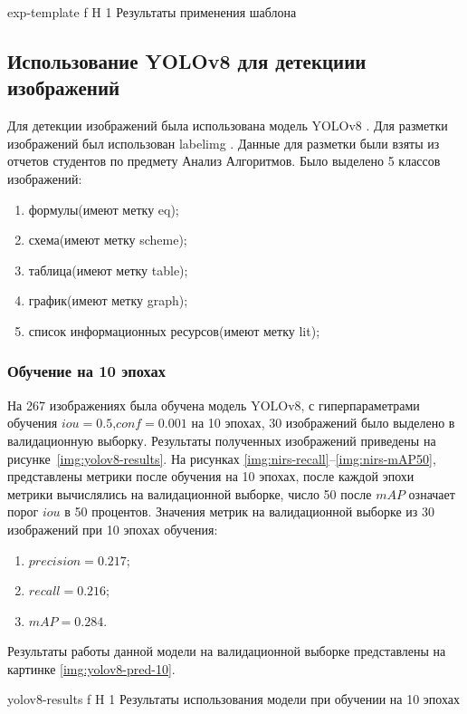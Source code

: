 {exp-template} %
{f} %
{H} %
{1\textwidth} %
{Результаты применения шаблона} %



\subsection{Использование YOLOv8 для детекциии изображений}
Для детекции изображений была использована модель YOLOv8 \cite{YOLOv8}. Для разметки изображений был использован labelimg \cite{labelimg}. Данные для разметки были взяты из отчетов студентов по предмету Анализ Алгоритмов.
Было выделено 5 классов изображений:
\begin{enumerate}
	\item формулы(имеют метку eq);
	\item схема(имеют метку scheme);
	\item таблица(имеют метку table);
	\item график(имеют метку graph);
	\item список информационных ресурсов(имеют метку lit);
\end{enumerate}

\subsubsection{Обучение на 10 эпохах}
На 267 изображениях была обучена модель YOLOv8, с гиперпараметрами обучения $iou=0.5$,$conf=0.001$ на 10 эпохах, 30 изображений было выделено в валидационную выборку.
Результаты полученных изображений приведены на рисунке~\ref{img:yolov8-results}.
На рисунках \ref{img:nirs-recall}--\ref{img:nirs-mAP50}, представлены метрики после обучения на 10 эпохах, 
после каждой эпохи метрики вычислялись на валидационной выборке,
число 50 после $mAP$  означает порог $iou$ в 50 процентов.
Значения метрик  на валидационной выборке из 30 изображений при 10 эпохах обучения:
\begin{enumerate}
	\item $precision=0.217$;
	\item $recall=0.216$;
	\item $mAP=0.284$.
\end{enumerate}
Результаты работы данной модели на валидационной выборке представлены на картинке \ref{img:yolov8-pred-10}.


{yolov8-results} %
{f} %
{H} %
{1\textwidth} %
{Результаты использования модели при обучении на 10 эпохах} %

